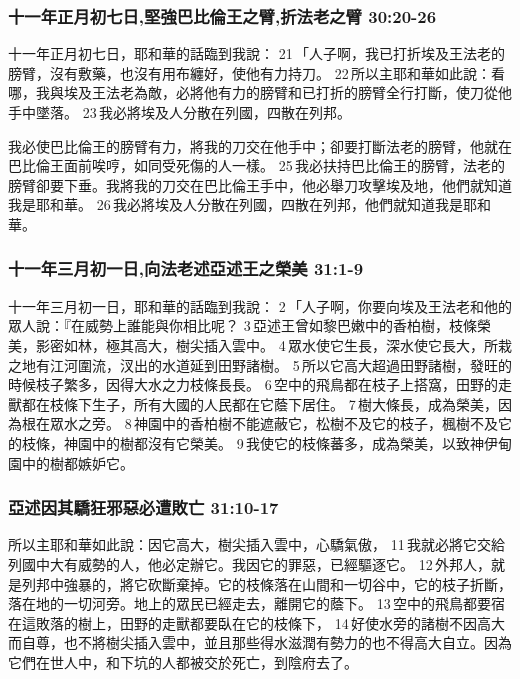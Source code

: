 \subsubsection{十一年正月初七日,堅強巴比倫王之臂,折法老之臂 30:20-26}
十一年正月初七日，耶和華的話臨到我說： 21 「人子啊，我已打折埃及王法老的膀臂，沒有敷藥，也沒有用布纏好，使他有力持刀。 22 所以主耶和華如此說：看哪，我與埃及王法老為敵，必將他有力的膀臂和已打折的膀臂全行打斷，使刀從他手中墜落。 23 我必將埃及人分散在列國，四散在列邦。


我必使巴比倫王的膀臂有力，將我的刀交在他手中；卻要打斷法老的膀臂，他就在巴比倫王面前唉哼，如同受死傷的人一樣。 25 我必扶持巴比倫王的膀臂，法老的膀臂卻要下垂。我將我的刀交在巴比倫王手中，他必舉刀攻擊埃及地，他們就知道我是耶和華。 26 我必將埃及人分散在列國，四散在列邦，他們就知道我是耶和華。

\subsubsection{十一年三月初一日,向法老述亞述王之榮美 31:1-9}
十一年三月初一日，耶和華的話臨到我說： 2 「人子啊，你要向埃及王法老和他的眾人說：『在威勢上誰能與你相比呢？ 3 亞述王曾如黎巴嫩中的香柏樹，枝條榮美，影密如林，極其高大，樹尖插入雲中。 4 眾水使它生長，深水使它長大，所栽之地有江河圍流，汊出的水道延到田野諸樹。 5 所以它高大超過田野諸樹，發旺的時候枝子繁多，因得大水之力枝條長長。 6 空中的飛鳥都在枝子上搭窩，田野的走獸都在枝條下生子，所有大國的人民都在它蔭下居住。 7 樹大條長，成為榮美，因為根在眾水之旁。 8 神園中的香柏樹不能遮蔽它，松樹不及它的枝子，楓樹不及它的枝條，神園中的樹都沒有它榮美。 9 我使它的枝條蕃多，成為榮美，以致神伊甸園中的樹都嫉妒它。

\subsubsection{亞述因其驕狂邪惡必遭敗亡 31:10-17}
所以主耶和華如此說：因它高大，樹尖插入雲中，心驕氣傲， 11 我就必將它交給列國中大有威勢的人，他必定辦它。我因它的罪惡，已經驅逐它。 12 外邦人，就是列邦中強暴的，將它砍斷棄掉。它的枝條落在山間和一切谷中，它的枝子折斷，落在地的一切河旁。地上的眾民已經走去，離開它的蔭下。 13 空中的飛鳥都要宿在這敗落的樹上，田野的走獸都要臥在它的枝條下， 14 好使水旁的諸樹不因高大而自尊，也不將樹尖插入雲中，並且那些得水滋潤有勢力的也不得高大自立。因為它們在世人中，和下坑的人都被交於死亡，到陰府去了。


